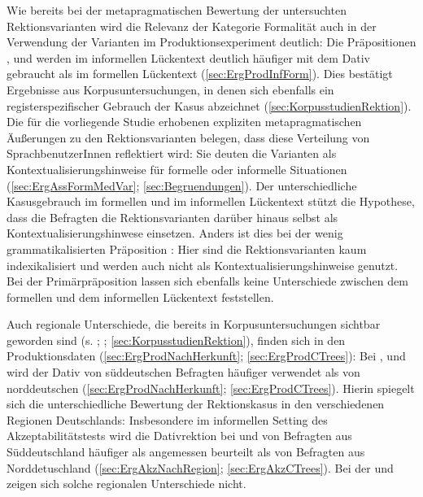 Wie bereits bei der metapragmatischen Bewertung der untersuchten Rektionsvarianten wird die Relevanz der Kategorie \glqq Formalität\grqq{} auch in der Verwendung der Varianten im Produktionsexperiment deutlich: 
Die Präpositionen \wegen{}, \waehrend{} und \dank{} werden im informellen Lückentext deutlich häufiger mit dem Dativ gebraucht als im formellen Lückentext (\autoref{sec:ErgProdInfForm}).
Dies bestätigt Ergebnisse aus Korpusuntersuchungen, in denen sich ebenfalls ein registerspezifischer Gebrauch der Kasus abzeichnet (\autoref{sec:KorpusstudienRektion}).
Die für die vorliegende Studie erhobenen expliziten metapragmatischen Äußerungen zu den Rektionsvarianten belegen, dass diese Verteilung von SprachbenutzerInnen reflektiert wird: 
Sie deuten die Varianten als Kontextualisierungshinweise für formelle oder informelle Situationen (\autoref{sec:ErgAssFormMedVar}; \autoref{sec:Begruendungen}).  
Der unterschiedliche Kasusgebrauch im formellen und im informellen Lückentext stützt die Hypothese, dass die Befragten die Rektionsvarianten darüber hinaus selbst als Kontextualisierungshinwese einsetzen. 
Anders ist dies bei der wenig grammatikalisierten Präposition \gegenueber{}:
Hier sind die Rektionsvarianten kaum indexikalisiert und werden auch nicht als Kontextualisierungshinweise genutzt. 
Bei der Primärpräposition  lassen sich ebenfalls keine Unterschiede zwischen dem formellen und dem informellen Lückentext feststellen. 
 
Auch regionale Unterschiede, die bereits in Korpusuntersuchungen sichtbar geworden sind (s. \citealp{Petig1997}; \citealp{Elter2005}; \autoref{sec:KorpusstudienRektion}), finden sich in den Produktionsdaten (\autoref{sec:ErgProdNachHerkunft}; \autoref{sec:ErgProdCTrees}): 
Bei \wegen{}, \waehrend{} und \dank{} wird der Dativ von süddeutschen Befragten häufiger verwendet als von norddeutschen (\autoref{sec:ErgProdNachHerkunft}; \autoref{sec:ErgProdCTrees}). 
Hierin spiegelt sich die unterschiedliche Bewertung der Rektionskasus in den verschiedenen Regionen Deutschlands:
Insbesondere im informellen Setting des Akzeptabilitätstests wird die Dativrektion bei \wegen{} und \waehrend{} von Befragten aus Süddeutschland häufiger als angemessen beurteilt als von Befragten aus Norddetuschland (\autoref{sec:ErgAkzNachRegion}; \autoref{sec:ErgAkzCTrees}). 
Bei der \gegenueber{} und  zeigen sich solche regionalen Unterschiede nicht. 

